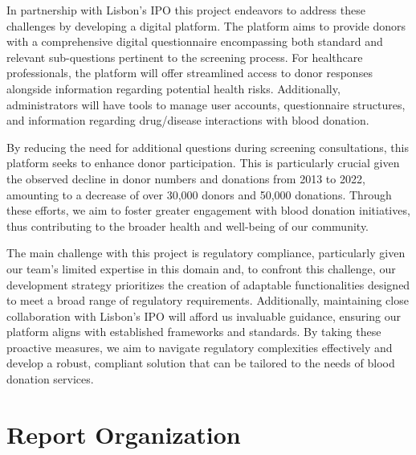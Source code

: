In partnership with Lisbon's IPO this project endeavors to address these challenges by developing a digital platform. The platform aims to provide donors with a comprehensive digital questionnaire encompassing both standard and relevant sub-questions pertinent to the screening process. For healthcare professionals, the platform will offer streamlined access to donor responses alongside information regarding potential health risks. Additionally, administrators will have tools to manage user accounts, questionnaire structures, and information regarding drug/disease interactions with blood donation.

By reducing the need for additional questions during screening consultations, this platform seeks to enhance donor participation. This is particularly crucial given the observed decline in donor numbers and donations from 2013 to 2022, amounting to a decrease of over 30,000 donors and 50,000 donations. Through these efforts, we aim to foster greater engagement with blood donation initiatives, thus contributing to the broader health and well-being of our community.

The main challenge with this project is regulatory compliance, particularly given our team's limited expertise in this domain and, to confront this challenge, our development strategy prioritizes the creation of adaptable functionalities designed to meet a broad range of regulatory requirements. Additionally, maintaining close collaboration with Lisbon's IPO will afford us invaluable guidance, ensuring our platform aligns with established frameworks and standards. By taking these proactive measures, we aim to navigate regulatory complexities effectively and develop a robust, compliant solution that can be tailored to the needs of blood donation services.

\section{Report Organization}

